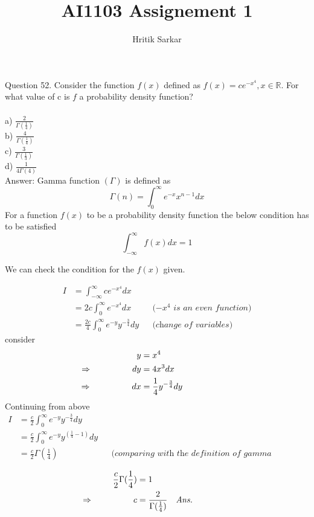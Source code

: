 \documentclass{article}
\title{AI1103 Assignement 1}
\author{Hritik Sarkar}
\theoremstyle{remark}
\begin{document}
\maketitle

Question 52. Consider the function $ f(x) $ defined as $ f(x) = c e^{-x^{4}}, x\in \mathbb{R}$. For what value of c is $f$ a probability density function?
\\
\\ a) $\frac{2}{\Gamma (\frac{1}{4})}$
\\ b) $\frac{4}{\Gamma (\frac{1}{4})}$
\\ c) $\frac{3}{\Gamma (\frac{1}{3})}$
\\ d) $\frac{1}{4\Gamma(4) }$
\\

Answer: Gamma function $(\Gamma)$ is defined as 
\[
\Gamma (n) = \int_{0}^{\infty} e^{-x} x^{n-1} dx
\]
For a function $f(x)$ to be a probability density function the below condition has to be satisfied
\[
\int_{-\infty}^{\infty} f(x) dx = 1
\]

We can check the condition for the $f(x)$ given.

\begin{align*}
    I &= \int_{-\infty}^{\infty} c e^{-x^{4}} dx \\
    &= 2c\int_{0}^{\infty}e^{-x^{4}} dx &&\textit{($-x^4$ is an even function)} \\
    &= \frac{2c}{4}\int_{0}^{\infty} e^{-y} y^{-\frac{3}{4}} dy &&\textit{(change of variables)}
\end{align*}
consider
\begin{align*}
  y&=x^4 \\
  \llap{$\Rightarrow$\hspace{50pt}} dy&=4x^3dx\\
  \llap{$\Rightarrow$\hspace{50pt}} dx &= \frac{1}{4} y^{-\frac{3}{4}} dy
\end{align*}
Continuing from above
\begin{align*}
    I &=\frac{c}{2}\int_{0}^{\infty} e^{-y} y^{-\frac{3}{4}} dy \\
    &= \frac{c}{2}\int_{0}^{\infty} e^{-y} y^{(\frac{1}{4}-1)} dy \\
    &= \frac{c}{2} \Gamma (\frac{1}{4}) &&\textit{(comparing with the definition of gamma function)}
\end{align*}

\begin{align*}
    \frac{c}{2}\Gamma (\frac{1}{4})&=1 \\
    \llap{$\Rightarrow$\hspace{50pt}}c&=\frac{2}{\Gamma (\frac{1}{4})} &&\textit{Ans.}
\end{align*}
\end{document}
